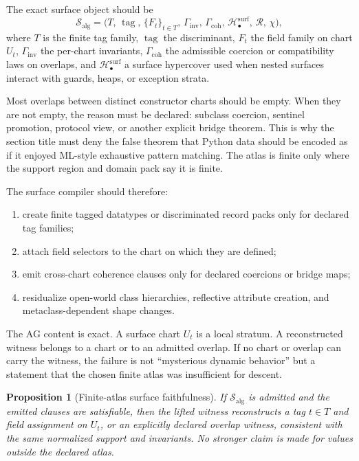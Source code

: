 \documentclass[11pt]{report}
\newtheorem{proposition}[definition]{Proposition}
\begin{document}
The exact surface object should be
\[
\mathcal{S}_{\mathrm{alg}}
=
\bigl(
T,\,
\operatorname{tag},\,
\{F_t\}_{t\in T},\,
\Gamma_{\mathrm{inv}},\,
\Gamma_{\mathrm{coh}},\,
\mathcal{H}^{\mathrm{surf}}_{\bullet},\,
\mathcal{R},\,
\chi
\bigr),
\]
where $T$ is the finite tag family, $\operatorname{tag}$ the discriminant, $F_t$ the field family on chart $U_t$, $\Gamma_{\mathrm{inv}}$ the per-chart invariants, $\Gamma_{\mathrm{coh}}$ the admissible coercion or compatibility laws on overlaps, and $\mathcal{H}^{\mathrm{surf}}_{\bullet}$ a surface hypercover used when nested surfaces interact with guards, heaps, or exception strata.

Most overlaps between distinct constructor charts should be empty. When they are not empty, the reason must be declared: subclass coercion, sentinel promotion, protocol view, or another explicit bridge theorem. This is why the section title must deny the false theorem that Python data should be encoded as if it enjoyed ML-style exhaustive pattern matching. The atlas is finite only where the support region and domain pack say it is finite.

The surface compiler should therefore:
\begin{enumerate}
\item create finite tagged datatypes or discriminated record packs only for declared tag families;
\item attach field selectors to the chart on which they are defined;
\item emit cross-chart coherence clauses only for declared coercions or bridge maps;
\item residualize open-world class hierarchies, reflective attribute creation, and metaclass-dependent shape changes.
\end{enumerate}

The AG content is exact. A surface chart $U_t$ is a local stratum. A reconstructed witness belongs to a chart or to an admitted overlap. If no chart or overlap can carry the witness, the failure is not ``mysterious dynamic behavior'' but a statement that the chosen finite atlas was insufficient for descent.

\begin{proposition}[Finite-atlas surface faithfulness]
If $\mathcal{S}_{\mathrm{alg}}$ is admitted and the emitted clauses are satisfiable, then the lifted witness reconstructs a tag $t\in T$ and field assignment on $U_t$, or an explicitly declared overlap witness, consistent with the same normalized support and invariants. No stronger claim is made for values outside the declared atlas.
\end{proposition}
\end{document}
